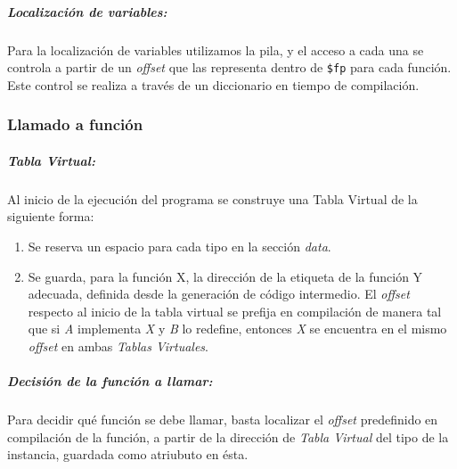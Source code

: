 \documentclass[a4paper,10pt,twocolumn]{article}
\begin{document}
\subparagraph{Localización de variables:}
	Para la localización de variables utilizamos la pila, y el acceso a cada una se controla a partir de un \textit{offset} que las representa dentro de \lstinline|$fp| para cada función. Este control se realiza a través de un diccionario en tiempo de compilación. 
	
\subsubsection{Llamado a función}

\subparagraph{Tabla Virtual:}
Al inicio de la ejecución del programa se construye una Tabla Virtual de la siguiente forma:

\begin{enumerate}
	\item Se reserva un espacio para cada tipo en la sección \textit{data}. 
	\item Se guarda, para la función X, la dirección de la etiqueta de la función Y adecuada, definida desde la generación de código intermedio. El \textit{offset} respecto al inicio de la tabla virtual se prefija en compilación de manera tal que si \textit{A} implementa \textit{X} y \textit{B} lo redefine, entonces \textit{X} se encuentra en el mismo \textit{offset} en ambas \textit{Tablas Virtuales}.
\end{enumerate}

\subparagraph{Decisión de la función a llamar:}
Para decidir qué función se debe llamar, basta localizar el \textit{offset} predefinido en compilación de la función, a partir de la dirección de \textit{Tabla Virtual} del tipo de la instancia, guardada como atriubuto en ésta.
\end{document}
